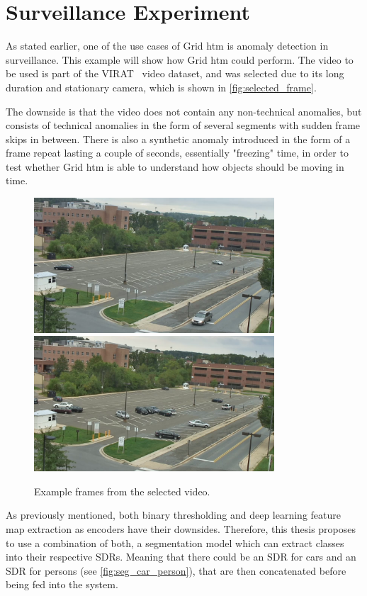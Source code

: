 \section{Surveillance Experiment}
As stated earlier, one of the use cases of Grid \gls*{htm} is anomaly detection in surveillance. This example will show how Grid \gls*{htm} could perform.
The video to be used is part of the VIRAT~\cite{VIRAT} video dataset, and was selected due to its long duration and stationary camera, which is shown in \autoref{fig:selected_frame}.
\par
The downside is that the video does not contain any non-technical anomalies, but consists of technical anomalies in the form of several segments with sudden frame skips in between. There is also a synthetic anomaly introduced in the form of a frame repeat lasting a couple of seconds, essentially "freezing" time, in order to test whether Grid \gls*{htm} is able to understand how objects should be moving in time.
\begin{figure}[H]
    \centering
    \includegraphics[width=0.8\textwidth]{resources/methodology/original.png}
    \includegraphics[width=0.8\textwidth]{resources/experiments/surveillance/parking_frame.png}
    \caption[Example Frames]{Example frames from the selected video.}
    \label{fig:selected_frame}
\end{figure}
As previously mentioned, both binary thresholding and deep learning feature map extraction as encoders have their downsides. Therefore, this thesis proposes to use a combination of both, a segmentation model which can extract classes into their respective SDRs. Meaning that there could be an SDR for cars and an SDR for persons (see \autoref{fig:seg_car_person}), that are then concatenated before being fed into the system.
